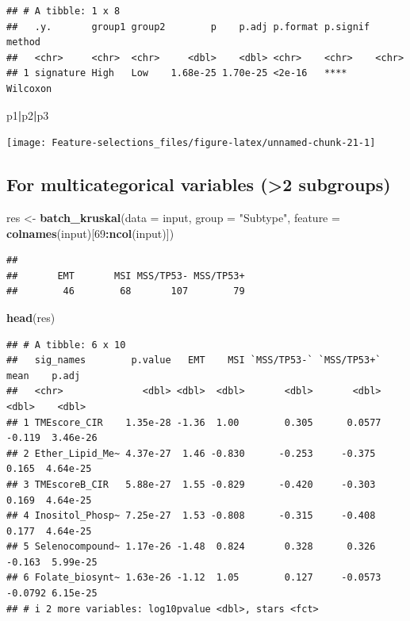 \documentclass[
  12pt,
]{book}
\newenvironment{Shaded}{\begin{snugshade}}{\end{snugshade}}
\newcommand{\AttributeTok}[1]{\textcolor[rgb]{0.13,0.29,0.53}{#1}}
\newcommand{\DecValTok}[1]{\textcolor[rgb]{0.00,0.00,0.81}{#1}}
\newcommand{\FunctionTok}[1]{\textcolor[rgb]{0.13,0.29,0.53}{\textbf{#1}}}
\newcommand{\NormalTok}[1]{#1}
\newcommand{\OtherTok}[1]{\textcolor[rgb]{0.56,0.35,0.01}{#1}}
\newcommand{\SpecialCharTok}[1]{\textcolor[rgb]{0.81,0.36,0.00}{\textbf{#1}}}
\newcommand{\StringTok}[1]{\textcolor[rgb]{0.31,0.60,0.02}{#1}}
\begin{document}
\begin{verbatim}
## # A tibble: 1 x 8
##   .y.       group1 group2        p    p.adj p.format p.signif method  
##   <chr>     <chr>  <chr>     <dbl>    <dbl> <chr>    <chr>    <chr>   
## 1 signature High   Low    1.68e-25 1.70e-25 <2e-16   ****     Wilcoxon
\end{verbatim}

\begin{Shaded}
\begin{Highlighting}[]
\NormalTok{p1}\SpecialCharTok{|}\NormalTok{p2}\SpecialCharTok{|}\NormalTok{p3}
\end{Highlighting}
\end{Shaded}

\begin{center}\texttt{[image: Feature-selections\_files/figure-latex/unnamed-chunk-21-1]} \end{center}

\hypertarget{for-multicategorical-variables-2-subgroups}{%
\subsection{For multicategorical variables (\textgreater2 subgroups)}\label{for-multicategorical-variables-2-subgroups}}

\begin{Shaded}
\begin{Highlighting}[]
\NormalTok{res }\OtherTok{\textless{}{-}} \FunctionTok{batch\_kruskal}\NormalTok{(}\AttributeTok{data =}\NormalTok{ input, }\AttributeTok{group =} \StringTok{"Subtype"}\NormalTok{, }\AttributeTok{feature =} \FunctionTok{colnames}\NormalTok{(input)[}\DecValTok{69}\SpecialCharTok{:}\FunctionTok{ncol}\NormalTok{(input)])}
\end{Highlighting}
\end{Shaded}

\begin{verbatim}
## 
##       EMT       MSI MSS/TP53- MSS/TP53+ 
##        46        68       107        79
\end{verbatim}

\begin{Shaded}
\begin{Highlighting}[]
\FunctionTok{head}\NormalTok{(res)}
\end{Highlighting}
\end{Shaded}

\begin{verbatim}
## # A tibble: 6 x 10
##   sig_names        p.value   EMT    MSI `MSS/TP53-` `MSS/TP53+`    mean    p.adj
##   <chr>              <dbl> <dbl>  <dbl>       <dbl>       <dbl>   <dbl>    <dbl>
## 1 TMEscore_CIR    1.35e-28 -1.36  1.00        0.305      0.0577 -0.119  3.46e-26
## 2 Ether_Lipid_Me~ 4.37e-27  1.46 -0.830      -0.253     -0.375   0.165  4.64e-25
## 3 TMEscoreB_CIR   5.88e-27  1.55 -0.829      -0.420     -0.303   0.169  4.64e-25
## 4 Inositol_Phosp~ 7.25e-27  1.53 -0.808      -0.315     -0.408   0.177  4.64e-25
## 5 Selenocompound~ 1.17e-26 -1.48  0.824       0.328      0.326  -0.163  5.99e-25
## 6 Folate_biosynt~ 1.63e-26 -1.12  1.05        0.127     -0.0573 -0.0792 6.15e-25
## # i 2 more variables: log10pvalue <dbl>, stars <fct>
\end{verbatim}
\end{document}
